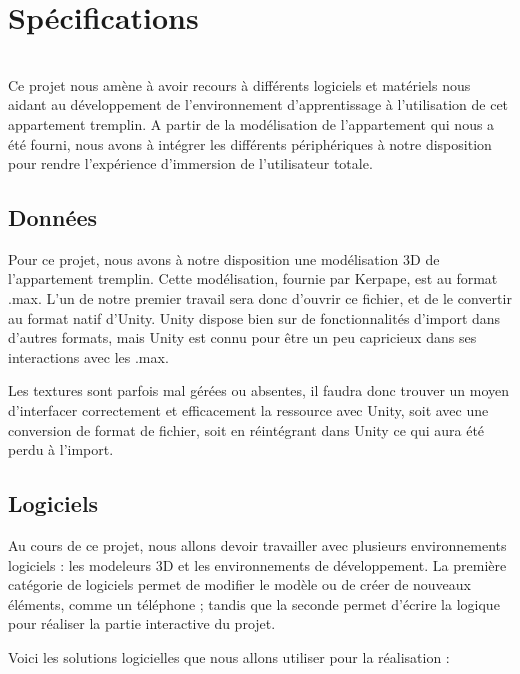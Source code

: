 \section{Spécifications}
\\
	Ce projet nous amène à avoir recours à différents logiciels et matériels nous aidant au développement de l'environnement d'apprentissage à l'utilisation de cet appartement tremplin. A partir de la modélisation de l'appartement qui nous a été fourni, nous avons à intégrer les différents périphériques à notre disposition pour rendre l'expérience d'immersion de l'utilisateur totale.
\\
\subsection{Données}
	Pour ce projet, nous avons à notre disposition une modélisation 3D de l'appartement tremplin. Cette modélisation, fournie par Kerpape, est au format .max. L'un de notre premier travail sera donc d'ouvrir ce fichier, et de le convertir au format natif d'Unity. Unity dispose bien sur de fonctionnalités d'import dans d'autres formats, mais Unity est connu pour être un peu capricieux dans ses interactions avec les .max.

	Les textures sont parfois mal gérées ou absentes, il faudra donc trouver un moyen d'interfacer correctement et efficacement la ressource avec Unity, soit avec une conversion de format de fichier, soit en réintégrant dans Unity ce qui aura été perdu à l'import.

\subsection{Logiciels}
	Au cours de ce projet, nous allons devoir travailler avec plusieurs environnements logiciels : les modeleurs 3D et les environnements de développement. La première catégorie de logiciels permet de modifier le modèle ou de créer de nouveaux éléments, comme un téléphone ; tandis que la seconde permet d'écrire la logique pour réaliser la partie interactive du projet.

	Voici les solutions logicielles que nous allons utiliser pour la réalisation :
